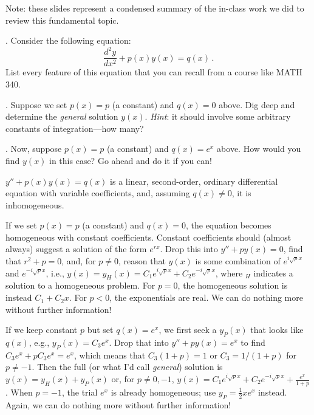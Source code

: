 \documentclass[compact]{ne630handout}
\begin{document}
\begin{handoutflow}


Note: these slides represent a condensed summary of the in-class work we did to
review this fundamental topic.



.  Consider the following equation:
\begin{equation*}
  \frac{d^2 y}{dx^2} + p(x)y(x) = q(x) \, .
\end{equation*}
List every feature of this equation that you can recall from a course like MATH 340.



. Suppose we set $p(x) = p$ (a constant) and $q(x) = 0$ above.  Dig deep and determine the {\it general} solution $y(x)$.  {\it Hint}: it should involve some arbitrary constants of integration---how many?




. Now, suppose $p(x) = p$ (a constant) and $q(x) = e^x$ above. How would you find $y(x)$ in this case?  Go ahead and do it if you can!



$y'' + p(x)y(x) = q(x)$ is a linear, second-order, ordinary differential equation with variable coefficients, and, assuming $q(x) \neq 0$, it is inhomogeneous.



If we set $p(x) = p$ (a constant) and $q(x) = 0$, the equation becomes homogeneous with constant coefficients.  Constant coefficients should (almost always) suggest a solution of the form $e^{rx}$.  Drop this into $y'' + py(x) = 0$, find that $r^2 + p = 0$, and, for $p\neq 0$, reason that $y(x)$ is some combination of $e^{i\sqrt{p}x}$ and $e^{-i\sqrt{p}x}$, i.e., $y(x) = y_H(x) = C_1 e^{i\sqrt{p}x} + C_2 e^{-i\sqrt{p}x}$, where $_H$ indicates a solution to a homogeneous problem.  For $p=0$, the homogeneous solution is instead $C_1+C_2x$. For $p<0$, the exponentials are real. We can do nothing more without further information!




If we keep constant $p$ but set $q(x) = e^x$, we first seek a $y_P(x)$ that looks like $q(x)$, e.g., $y_P(x) = C_3 e^{x}$.  Drop that into $y'' + py(x) = e^x$ to find $C_3 e^{x} + p C_3 e^x = e^x$, which means that $C_3(1+p) = 1$ or $C_3 = 1/(1+p)$ for $p\neq -1$.  Then the full (or what I'd call {\it general}) solution is $y(x) = y_H(x) + y_P(x)$ or, for $p\neq 0,-1$, $y(x) =  C_1 e^{i\sqrt{p}x} + C_2 e^{-i\sqrt{p}x} + \frac{e^x}{1+p}$.  When $p=-1$, the trial $e^x$ is already homogeneous; use $y_P=\tfrac12 xe^x$ instead. Again, we can do nothing more without further information!


\end{handoutflow}
\end{document}
